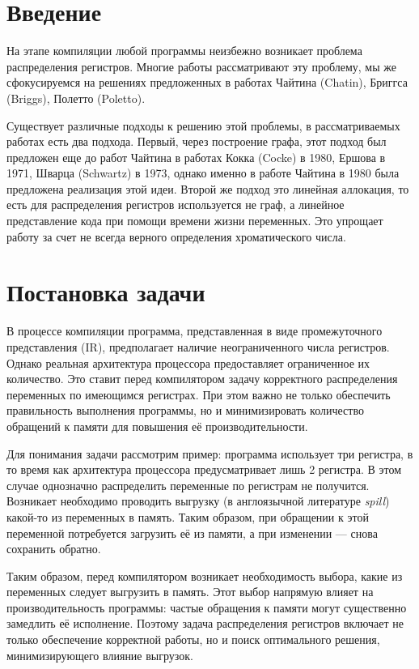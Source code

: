 \documentclass[12pt]{article}
\begin{document}
\section{Введение}

На этапе компиляции любой программы неизбежно возникает проблема распределения регистров. %
Многие работы рассматривают эту проблему, мы же сфокусируемся на решениях предложенных в
работах Чайтина (Chatin), Бриггса (Briggs), Полетто (Poletto). %

Существует различные подходы к решению этой проблемы, в рассматриваемых работах есть два
подхода. Первый, через построение графа, этот подход был предложен еще до работ Чайтина в
работах Кокка (Cocke) в 1980, Ершова в 1971, Шварца (Schwartz) в 1973, однако именно в
работе Чайтина в 1980 была предложена реализация этой идеи. Второй же подход это линейная аллокация,
то есть для распределения регистров используется не граф, а линейное представление кода при
помощи времени жизни переменных. Это упрощает работу за счет не всегда верного определения
хроматического числа. %

\section{Постановка задачи}
В процессе компиляции программа, представленная в виде промежуточного представления (IR), предполагает
наличие неограниченного числа регистров. Однако реальная архитектура процессора предоставляет ограниченное
их количество. Это ставит перед компилятором задачу корректного распределения переменных по имеющимся
регистрах. При этом важно не только обеспечить правильность выполнения программы, но и минимизировать
количество обращений к памяти для повышения её производительности.

Для понимания задачи рассмотрим пример: программа использует три регистра, в то время как архитектура
процессора предусматривает лишь 2 регистра. В этом случае однозначно распределить переменные по регистрам
не получится. Возникает необходимо проводить выгрузку (в англоязычной литературе \textit{spill})
какой-то из переменных в память. Таким образом, при обращении к этой переменной потребуется загрузить
её из памяти, а при изменении — снова сохранить обратно.

Таким образом, перед компилятором возникает необходимость выбора, какие из переменных следует выгрузить
в память. Этот выбор напрямую влияет на производительность программы: частые обращения к памяти могут
существенно замедлить её исполнение. Поэтому задача распределения регистров включает не только обеспечение
корректной работы, но и поиск оптимального решения, минимизирующего влияние выгрузок.
\end{document}
